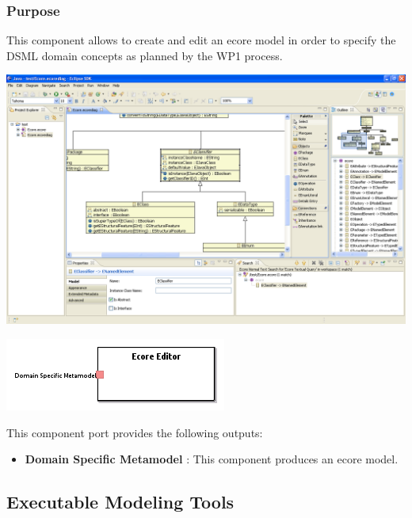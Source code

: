 \documentclass{gemoc} %
\begin{document}

\subsubsection{Purpose}
This component allows to create and edit an ecore model in order to specify the DSML domain concepts as planned by the WP1 process.
\begin{center}
\includegraphics*[trim=0.0cm 0.0cm 0cm 0.0cm, clip=true, width=1.0\linewidth]{../images/EcoreDiagramOverview.png}
\end{center}

\begin{center}
\includegraphics*[trim=0.0cm 0.0cm 0cm 0.0cm, clip=true]{../images/generated/Generated_Ecore_Editor.png}
\end{center}


This component port provides the following outputs:
\begin{itemize}
  \item \textbf{Domain Specific Metamodel} :
This component produces an ecore model.
\end{itemize}


\subsection{Executable Modeling Tools}
\end{document}
